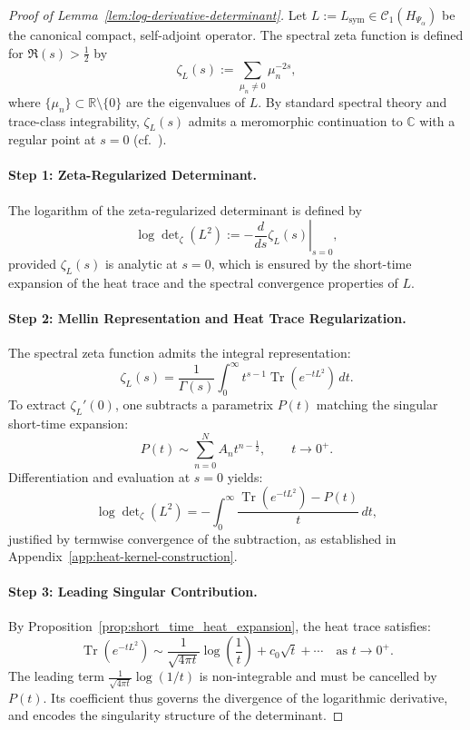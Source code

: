 \begin{proof}[Proof of Lemma~\ref{lem:log-derivative-determinant}]
Let \( L := L_{\mathrm{sym}} \in \mathcal{C}_1(H_{\Psi_\alpha}) \) be the canonical compact, self-adjoint operator. The spectral zeta function is defined for \( \Re(s) > \tfrac{1}{2} \) by
\[
\zeta_L(s) := \sum_{\mu_n \neq 0} \mu_n^{-2s},
\]
where \( \{ \mu_n \} \subset \mathbb{R} \setminus \{0\} \) are the eigenvalues of \( L \). By standard spectral theory and trace-class integrability, \( \zeta_L(s) \) admits a meromorphic continuation to \( \mathbb{C} \) with a regular point at \( s = 0 \) (cf.~\cite[Ch.~3]{Simon2005TraceIdeals}).

\paragraph{Step 1: Zeta-Regularized Determinant.}
The logarithm of the zeta-regularized determinant is defined by
\[
\log \det\nolimits_\zeta(L^2) := -\left. \frac{d}{ds} \zeta_L(s) \right|_{s=0},
\]
provided \( \zeta_L(s) \) is analytic at \( s = 0 \), which is ensured by the short-time expansion of the heat trace and the spectral convergence properties of \( L \).

\paragraph{Step 2: Mellin Representation and Heat Trace Regularization.}
The spectral zeta function admits the integral representation:
\[
\zeta_L(s) = \frac{1}{\Gamma(s)} \int_0^\infty t^{s - 1} \operatorname{Tr}(e^{-t L^2}) \, dt.
\]
To extract \( \zeta_L'(0) \), one subtracts a parametrix \( P(t) \) matching the singular short-time expansion:
\[
P(t) \sim \sum_{n=0}^{N} A_n t^{n - \frac{1}{2}}, \qquad t \to 0^+.
\]
Differentiation and evaluation at \( s = 0 \) yields:
\[
\log \det\nolimits_\zeta(L^2)
= -\int_0^\infty \frac{\operatorname{Tr}(e^{-t L^2}) - P(t)}{t} \, dt,
\]
justified by termwise convergence of the subtraction, as established in Appendix~\ref{app:heat-kernel-construction}.

\paragraph{Step 3: Leading Singular Contribution.}
By Proposition~\ref{prop:short_time_heat_expansion}, the heat trace satisfies:
\[
\operatorname{Tr}(e^{-t L^2}) \sim \frac{1}{\sqrt{4\pi t}} \log\left( \frac{1}{t} \right) + c_0 \sqrt{t} + \cdots \quad \text{as } t \to 0^+.
\]
The leading term \( \frac{1}{\sqrt{4\pi t}} \log(1/t) \) is non-integrable and must be cancelled by \( P(t) \). Its coefficient thus governs the divergence of the logarithmic derivative, and encodes the singularity structure of the determinant.


\end{proof}
